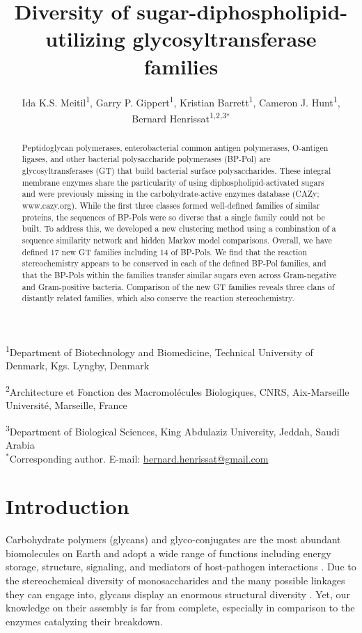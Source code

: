 \documentclass{article}
\title{Diversity of sugar-diphospholipid-utilizing glycosyltransferase families}
\author{Ida K.S. Meitil\textsuperscript{1}, Garry P. Gippert\textsuperscript{1}, Kristian Barrett\textsuperscript{1}, Cameron J. Hunt\textsuperscript{1}, Bernard Henrissat\textsuperscript{1,2,3}$^{\ast}$}
\begin{document}
\maketitle

\noindent\textsuperscript{1}Department of Biotechnology and Biomedicine, Technical University of Denmark, Kgs. Lyngby, Denmark

\noindent\textsuperscript{2}Architecture et Fonction des Macromolécules Biologiques, CNRS, Aix-Marseille Université, Marseille, France

\noindent\textsuperscript{3}Department of Biological Sciences, King Abdulaziz University, Jeddah, Saudi Arabia\\

\noindent$^{\ast}$Corresponding author. E-mail: \url{bernard.henrissat@gmail.com}

\begin{abstract}
\noindent Peptidoglycan polymerases, enterobacterial common antigen polymerases, O-antigen ligases, and other bacterial polysaccharide polymerases (BP-Pol) are glycosyltransferases (GT) that build bacterial surface polysaccharides. These integral membrane enzymes share the particularity of using diphospholipid-activated sugars and were previously missing in the carbohydrate-active enzymes database (CAZy; www.cazy.org). While the first three classes formed well-defined families of similar proteins, the sequences of BP-Pols were so diverse that a single family could not be built. To address this, we developed a new clustering method using a combination of a sequence similarity network and hidden Markov model comparisons. Overall, we have defined 17 new GT families including 14 of BP-Pols. We find that the reaction stereochemistry appears to be conserved in each of the defined BP-Pol families, and that the BP-Pols within the families transfer similar sugars even across Gram-negative and Gram-positive bacteria. Comparison of the new GT families reveals three clans of distantly related families, which also conserve the reaction stereochemistry.

\end{abstract}

\section{Introduction}

Carbohydrate polymers (glycans) and glyco-conjugates are the most abundant biomolecules on Earth and adopt a wide range of functions including energy storage, structure, signaling, and mediators of host-pathogen interactions \cite{varki_essentials_2022}. Due to the stereochemical diversity of monosaccharides and the many possible linkages they can engage into, glycans display an enormous structural diversity \cite{laine_calculation_1994,lapebie_bacteroidetes_2019}. Yet, our knowledge on their assembly is far from complete, especially in comparison to the enzymes catalyzing their breakdown.
 
\end{document}
